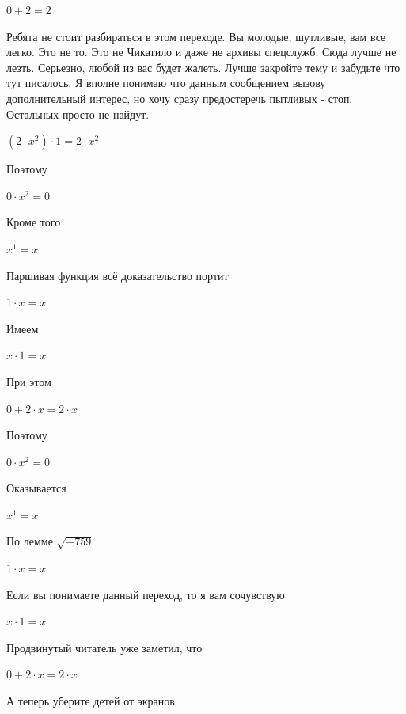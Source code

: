 \documentclass[12pt,a4paper,fleqn]{article}
\begin{document}
\begin{center}
$0+2 = 2$\end{center}
Ребята не стоит разбираться в этом переходе. Вы молодые, шутливые, вам все легко. Это не то. Это не Чикатило и даже не архивы спецслужб. Сюда лучше не лезть. Серьезно, любой из вас будет жалеть. Лучше закройте тему и забудьте что тут писалось. Я вполне понимаю что данным сообщением вызову дополнительный интерес, но хочу сразу предостеречь пытливых - стоп. Остальных просто не найдут.

\begin{center}
$(2 \cdot x^{2}) \cdot 1 = 2 \cdot x^{2}$\end{center}
Поэтому

\begin{center}
$0 \cdot x^{2} = 0$\end{center}
Кроме того

\begin{center}
$x^{1} = x$\end{center}
Паршивая функция всё доказательство портит\cite{link2}

\begin{center}
$1 \cdot x = x$\end{center}
Имеем

\begin{center}
$x \cdot 1 = x$\end{center}
При этом

\begin{center}
$0+2 \cdot x = 2 \cdot x$\end{center}
Поэтому

\begin{center}
$0 \cdot x^{2} = 0$\end{center}
Оказывается

\begin{center}
$x^{1} = x$\end{center}
По лемме $\sqrt{-759}$
\begin{center}
$1 \cdot x = x$\end{center}
Если вы понимаете данный переход, то я вам сочувствую

\begin{center}
$x \cdot 1 = x$\end{center}
Продвинутый читатель уже заметил, что

\begin{center}
$0+2 \cdot x = 2 \cdot x$\end{center}
А теперь уберите детей от экранов
\end{document}
